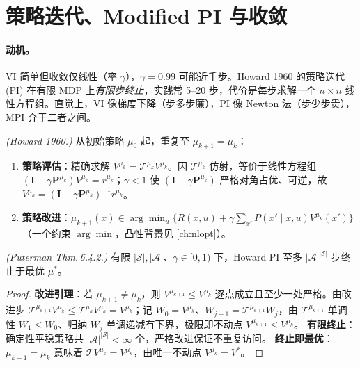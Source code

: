 \section{策略迭代、Modified PI 与收敛}
\label{sec:dp-pi}

\paragraph{动机。}
VI 简单但收敛仅线性（率 $\gamma$），$\gamma=0.99$ 可能近千步。Howard 1960 的策略迭代 (PI) 在有限 MDP 上\emph{有限步终止}，实践常 5--20 步，代价是每步求解一个 $n\times n$ 线性方程组。直觉上，VI 像梯度下降（步多步廉），PI 像 Newton 法（步少步贵），MPI 介于二者之间。

\begin{definition}\label{def:dp-pi}
\emph{(Howard 1960\cite{howard1960dp}.)} 从初始策略 $\mu_0$ 起，重复至 $\mu_{k+1}=\mu_k$：
\begin{enumerate}
  \item \textbf{策略评估}：精确求解 $V^{\mu_k}=\mathcal T^{\mu_k}V^{\mu_k}$。因 $\mathcal T^{\mu_k}$ 仿射，等价于线性方程组 $(\mathbf I-\gamma \mathbf P^{\mu_k})V^{\mu_k}=r^{\mu_k}$；$\gamma<1$ 使 $(\mathbf I-\gamma\mathbf P^{\mu_k})$ 严格对角占优、可逆，故 $V^{\mu_k}=(\mathbf I-\gamma\mathbf P^{\mu_k})^{-1}r^{\mu_k}$。
  \item \textbf{策略改进}：$\mu_{k+1}(x)\in\arg\min_{u}\{R(x,u)+\gamma\sum_{x'}P(x'\mid x,u)V^{\mu_k}(x')\}$（一个约束 $\arg\min$，凸性背景见 \cref{ch:nlopt}）。
\end{enumerate}
\end{definition}

\begin{theorem}[PI 有限步终止]\label{thm:dp-pi-finite}
\emph{(Puterman Thm.\,6.4.2\cite{puterman1994mdp}.)} 有限 $|\mathcal S|,|\mathcal A|$、$\gamma\in[0,1)$ 下，Howard PI 至多 $|\mathcal A|^{|\mathcal S|}$ 步终止于最优 $\mu^*$。
\end{theorem}

\begin{proof}
\textbf{改进引理}：若 $\mu_{k+1}\ne\mu_k$，则 $V^{\mu_{k+1}}\le V^{\mu_k}$ 逐点成立且至少一处严格。由改进步 $\mathcal T^{\mu_{k+1}}V^{\mu_k}\le\mathcal T^{\mu_k}V^{\mu_k}=V^{\mu_k}$；记 $W_0=V^{\mu_k}$、$W_{j+1}=\mathcal T^{\mu_{k+1}}W_j$，由 $\mathcal T^{\mu_{k+1}}$ 单调性 $W_1\le W_0$、归纳 $W_j$ 单调递减有下界，极限即不动点 $V^{\mu_{k+1}}\le V^{\mu_k}$。
\textbf{有限终止}：确定性平稳策略共 $|\mathcal A|^{|\mathcal S|}<\infty$ 个，严格改进保证不重复访问。
\textbf{终止即最优}：$\mu_{k+1}=\mu_k$ 意味着 $\mathcal TV^{\mu_k}=V^{\mu_k}$，由唯一不动点 $V^{\mu_k}=V^*$。
\end{proof}


